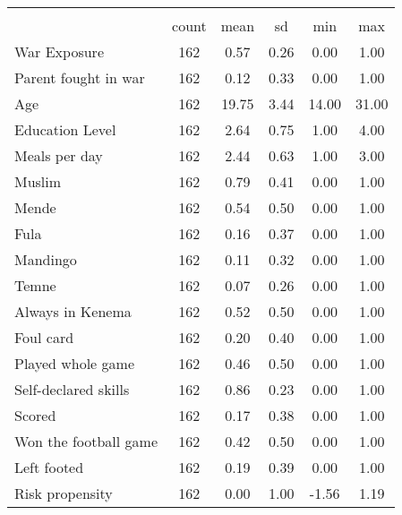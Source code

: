 {
\def\sym#1{\ifmmode^{#1}\else\(^{#1}\)\fi}
\begin{tabular}{l*{1}{ccccc}}
\hline\hline
                    &\multicolumn{5}{c}{}                                            \\
                    &       count&        mean&          sd&         min&         max\\
\hline
War Exposure        &         162&        0.57&        0.26&        0.00&        1.00\\
Parent fought in war&         162&        0.12&        0.33&        0.00&        1.00\\
Age                 &         162&       19.75&        3.44&       14.00&       31.00\\
Education Level     &         162&        2.64&        0.75&        1.00&        4.00\\
Meals per day       &         162&        2.44&        0.63&        1.00&        3.00\\
Muslim              &         162&        0.79&        0.41&        0.00&        1.00\\
Mende               &         162&        0.54&        0.50&        0.00&        1.00\\
Fula                &         162&        0.16&        0.37&        0.00&        1.00\\
Mandingo            &         162&        0.11&        0.32&        0.00&        1.00\\
Temne               &         162&        0.07&        0.26&        0.00&        1.00\\
Always in Kenema    &         162&        0.52&        0.50&        0.00&        1.00\\
Foul card           &         162&        0.20&        0.40&        0.00&        1.00\\
Played whole game   &         162&        0.46&        0.50&        0.00&        1.00\\
Self-declared skills&         162&        0.86&        0.23&        0.00&        1.00\\
Scored              &         162&        0.17&        0.38&        0.00&        1.00\\
Won the football game&         162&        0.42&        0.50&        0.00&        1.00\\
Left footed         &         162&        0.19&        0.39&        0.00&        1.00\\
Risk propensity     &         162&        0.00&        1.00&       -1.56&        1.19\\

\end{tabular}}
